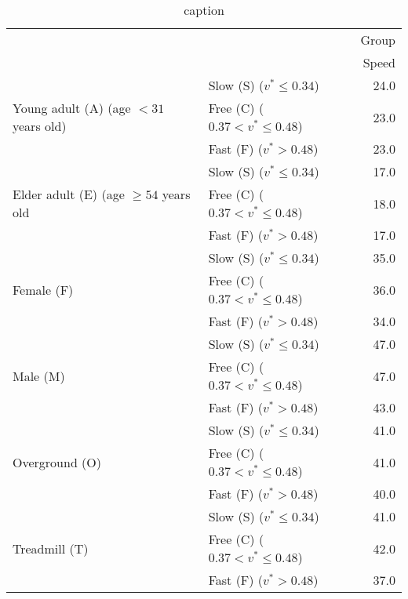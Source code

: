 \begin{table}
\centering
\caption{caption}
\label{tab:tableN}
\begin{tabular}{llr}
\toprule
              &                       &      Group \\
              &                       &      Speed \\
\midrule
\multirow{3}{*}{Young adult (A) (age $< 31$ years old)} & Slow (S) ($v^*\le 0.34$) &       24.0 \\
              & Free (C) ($0.37 < v^* \le 0.48$) &       23.0 \\
              & Fast (F) ($v^*>0.48$) &       23.0 \\
\cline{1-3}
\multirow{3}{*}{Elder adult (E) (age $\ge 54$ years old} & Slow (S) ($v^*\le 0.34$) &       17.0 \\
              & Free (C) ($0.37 < v^* \le 0.48$) &       18.0 \\
              & Fast (F) ($v^*>0.48$) &       17.0 \\
\cline{1-3}
\multirow{3}{*}{Female (F)} & Slow (S) ($v^*\le 0.34$) &       35.0 \\
              & Free (C) ($0.37 < v^* \le 0.48$) &       36.0 \\
              & Fast (F) ($v^*>0.48$) &       34.0 \\
\cline{1-3}
\multirow{3}{*}{Male (M)} & Slow (S) ($v^*\le 0.34$) &       47.0 \\
              & Free (C) ($0.37 < v^* \le 0.48$) &       47.0 \\
              & Fast (F) ($v^*>0.48$) &       43.0 \\
\cline{1-3}
\multirow{3}{*}{Overground (O)} & Slow (S) ($v^*\le 0.34$) &       41.0 \\
              & Free (C) ($0.37 < v^* \le 0.48$) &       41.0 \\
              & Fast (F) ($v^*>0.48$) &       40.0 \\
\cline{1-3}
\multirow{3}{*}{Treadmill (T)} & Slow (S) ($v^*\le 0.34$) &       41.0 \\
              & Free (C) ($0.37 < v^* \le 0.48$) &       42.0 \\
              & Fast (F) ($v^*>0.48$) &       37.0 \\
\bottomrule
\end{tabular}
\end{table}

